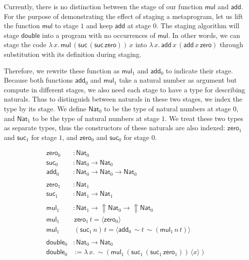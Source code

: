 Currently, there is no distinction between the stage of our function $\mathsf{mul}$ and $\mathsf{add}$. For the purpose of demonstrating the effect of staging a metaprogram, let us lift the function $\mathsf{mul}$ to stage $1$ and keep $\mathsf{add}$ at stage $0$. The staging algorithm will stage $\mathsf{double}$ into a program with no occurrences of $\mathsf{mul}$. In other words, we can stage the code $\lambda\,x.\,\mathsf{mul}\,(\mathsf{suc}\,(\mathsf{suc}\,\mathsf{zero}))\,x$ into $\lambda\,x.\,\mathsf{add}\,x\,(\mathsf{add}\,x\,\mathsf{zero})$ through substitution with its definition during staging. 

Therefore, we rewrite these function as $\mathsf{mul}_1$ and $\mathsf{add}_0$ to indicate their stage. Because both functions $\mathsf{add}_0$ and $\mathsf{mul}_1$ take a natural number as argument but compute in different stages, we also need each stage to have a type for describing naturals. Thus to distinguish between naturals in these two stages, we index the type by its stage. We define $\mathsf{Nat}_0$ to be the type of natural numbers at stage $0$, and $\mathsf{Nat}_1$ to be the type of natural numbers at stage $1$. We treat these two types as separate types, thus the constructors of these naturals are also indexed: $\mathsf{zero}_1$ and $\mathsf{suc}_1$ for stage $1$, and $\mathsf{zero}_0$ and $\mathsf{suc}_0$ for stage $0$. 

$$
\begin{aligned}
    \mathsf{zero}_0&:\mathsf{Nat}_0\\
    \mathsf{suc}_0&:\mathsf{Nat}_0\to\mathsf{Nat}_0\\
    \mathsf{add}_0&:\mathsf{Nat}_0\to\mathsf{Nat}_0\to\mathsf{Nat}_0\\
    \\
    \mathsf{zero}_1&:\mathsf{Nat}_1\\
    \mathsf{suc}_1&:\mathsf{Nat}_1\to\mathsf{Nat}_1\\
    \\
    \mathsf{mul}_1&:\mathsf{Nat}_1\to{\Uparrow}\mathsf{Nat}_0\to{\Uparrow}\mathsf{Nat}_0\\
    \mathsf{mul}_1&\,\mathsf{zero}_1\,t=\langle \mathsf{zero}_0\rangle\\
    \mathsf{mul}_1&\,(\mathsf{suc}_1\,n)\,t=\langle \mathsf{add}_0\,{\sim}t\,{\sim}(\mathsf{mul}_1\,n\,t)\rangle\\
    \\
    \mathsf{double}_0&:\mathsf{Nat}_0\to\mathsf{Nat}_0\\
    \mathsf{double}_0&:=\lambda\,x.\,{\sim}(\mathsf{mul}_1\,(\mathsf{suc}_1\,(\mathsf{suc}_1\,\mathsf{zero}_1))\,\langle x\rangle)\\
\end{aligned}
$$


